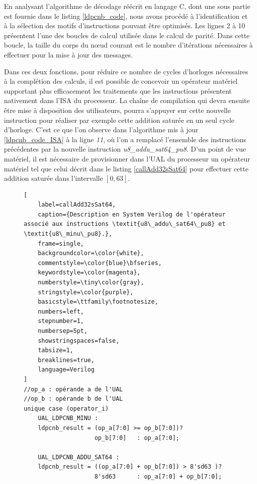\documentclass[../main.tex]{subfiles}
\begin{document}
En analysant l'algorithme de décodage réécrit en langage C, dont une sous partie est fournie dans le listing \ref{ldpcnb_code}, nous avons procédé à l'identification et à la sélection des motifs d'instructions pouvant être optimisés. Les lignes 2 à 10 présentent l'une des boucles de calcul utilisée dans le calcul de parité. Dans cette boucle, la taille du corps du nœud courant est le nombre d'itérations nécessaires à effectuer pour la mise à jour des messages.


Dans ces deux fonctions, pour réduire ce nombre de cycles d'horloges nécessaires à la complétion des calculs, il est possible de concevoir un opérateur matériel supportant plus efficacement les traitements que les instructions présentent nativement dans l'ISA du processeur. La chaîne de compilation qui devra ensuite être mise à disposition des utilisateurs, pourra s'appuyer sur cette nouvelle instruction pour réaliser par exemple cette addition saturée en un seul cycle d'horloge. 
C'est ce que l'on observe dans l'algorithme mis à jour \ref{ldpcnb_code_ISA} à la ligne \textit{11}, où l'on a remplacé l'ensemble des instructions précédentes par la nouvelle instruction \textit{u8\_addu\_sat64\_pu8}. D'un point de vue matériel, il est nécessaire de provisionner dans l'UAL du processeur un opérateur matériel tel que celui décrit dans le listing \ref{callAdd32sSat64} pour effectuer cette addition saturée dans l'intervalle $[0, 63]$.


\begin{figure}[!tb]
\begin{lstlisting}[
    label=callAdd32sSat64,
    caption={Description en System Verilog de l'opérateur associé aux instructions \textit{u8\_addu\_sat64\_pu8} et \textit{u8\_minu\_pu8}.},
    frame=single,
    backgroundcolor=\color{white},  
    commentstyle=\color{blue}\bfseries,
    keywordstyle=\color{magenta},
    numberstyle=\tiny\color{gray},
    stringstyle=\color{purple},
    basicstyle=\ttfamily\footnotesize,
    numbers=left,
    stepnumber=1,
    numbersep=5pt,                 
    showstringspaces=false,
    tabsize=1,
    breaklines=true,
    language=Verilog
]
//op_a : opérande a de l'UAL 
//op_b : opérande b de l'UAL
unique case (operator_i)
    UAL_LDPCNB_MINU : 
    ldpcnb_result = (op_a[7:0] >= op_b[7:0])?
                    op_b[7:0]   : op_a[7:0];

    UAL_LDPCNB_ADDU_SAT64 :
    ldpcnb_result = ((op_a[7:0] + op_b[7:0]) > 8'sd63 )?
                    8'sd63      : op_a[7:0] + op_b[7:0]; 
\end{lstlisting}
\end{figure}
\end{document}
